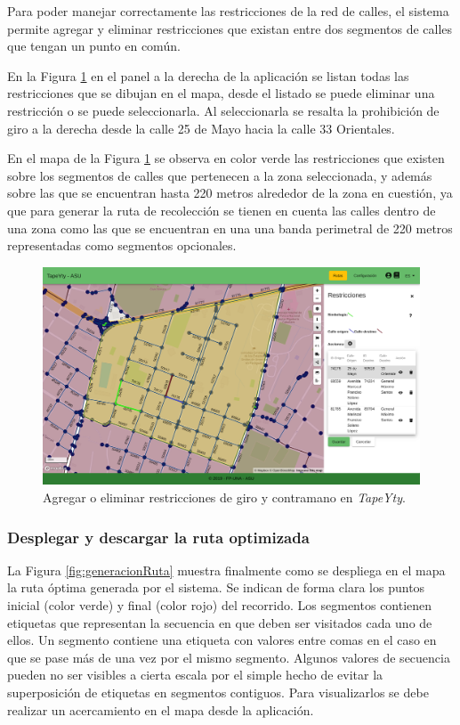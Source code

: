 Para poder manejar correctamente las restricciones de la red de calles, el sistema permite agregar y eliminar restricciones que existan entre dos segmentos de calles que tengan un punto en común. 

En la Figura \ref{fig:restriccion} en el panel a la derecha de la aplicación se listan todas las restricciones que se dibujan en el mapa, desde el listado se puede eliminar una restricción o se puede seleccionarla. Al seleccionarla se resalta la prohibición de giro a la derecha desde la calle 25 de Mayo hacia la calle 33 Orientales.

En el mapa de la Figura \ref{fig:restriccion} se observa en color verde las restricciones que existen sobre los segmentos de calles que pertenecen a la zona seleccionada, y además sobre las que se encuentran hasta 220 metros alrededor de la zona en cuestión, ya que para generar la ruta de recolección se tienen en cuenta las calles dentro de una zona como las que se encuentran en una una banda perimetral de 220 metros representadas como segmentos opcionales.

\begin{figure}[H]
\centerline{\includegraphics[width=\textwidth]{restricciones.png}}
\caption{Agregar o eliminar restricciones de giro y contramano en \textit{TapeYty}.}
\label{fig:restriccion}
\end{figure}

\subsubsection{Desplegar y descargar la ruta optimizada}

La Figura \ref{fig:generacionRuta} muestra finalmente como se despliega en el mapa la ruta óptima generada por el sistema. Se indican de forma clara los puntos inicial (color verde) y final (color rojo) del recorrido. Los segmentos contienen etiquetas que representan la secuencia en que deben ser visitados cada uno de ellos. Un segmento contiene una etiqueta con valores entre comas en el caso en que se pase más de una vez por el mismo segmento. Algunos valores de secuencia pueden no ser visibles a cierta escala por el simple hecho de evitar la superposición de etiquetas en segmentos contiguos. Para visualizarlos se debe realizar un acercamiento en el mapa desde la aplicación.

